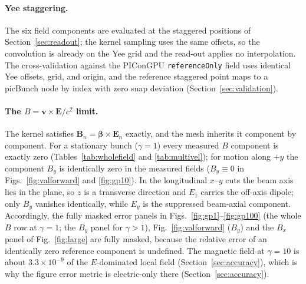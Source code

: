 \paragraph{Yee staggering.}
The six field components are evaluated at the staggered positions of
Section~\ref{sec:readout}; the kernel sampling uses the same offsets, so the
convolution is already on the Yee grid and the read-out applies no
interpolation. The cross-validation against the PIConGPU
\texttt{referenceOnly} field uses identical Yee offsets, grid, and origin,
and the reference staggered point maps to a picBunch node by index with zero
snap deviation (Section~\ref{sec:validation}).

\paragraph{The $B = \boldsymbol{v}\times\boldsymbol{E}/c^2$ limit.}
The kernel satisfies $\mathbf{B}_n = \boldsymbol{\beta}\times\mathbf{E}_n$
exactly, and the mesh inherits it component by component. For a stationary
bunch ($\gamma=1$) every measured $B$ component is exactly zero
(Tables~\ref{tab:wholefield} and \ref{tab:multivel}); for motion along
$+y$ the component $B_y$ is identically zero in the measured fields
($B_y\equiv 0$ in Figs.~\ref{fig:valforward} and
\ref{fig:gp10}). In the longitudinal $x$--$y$ cuts the beam axis lies in
the plane, so $z$ is a transverse direction and $E_z$ carries the off-axis
dipole; only $B_y$ vanishes identically, while $E_y$ is the suppressed
beam-axial component. Accordingly, the fully masked error panels in
Figs.~\ref{fig:gp1}--\ref{fig:gp100} (the whole $B$ row at $\gamma=1$;
the $B_y$ panel for $\gamma>1$), Fig.~\ref{fig:valforward} ($B_y$) and
the $B_x$ panel of Fig.~\ref{fig:large} are fully masked, because the
relative error of an identically zero reference component is undefined. The magnetic field at
$\gamma=10$ is about
$3.3\!\times\!10^{-9}$ of the $E$-dominated local field
(Section~\ref{sec:accuracy}), which is why the
figure error metric is electric-only there (Section~\ref{sec:accuracy}).
